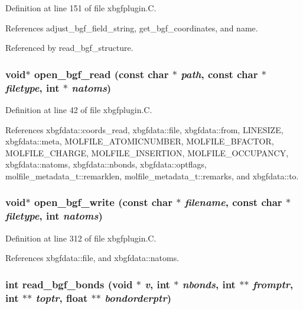 Definition at line 151 of file xbgfplugin.C.

References adjust\_\-bgf\_\-field\_\-string, get\_\-bgf\_\-coordinates, and name.

Referenced by read\_\-bgf\_\-structure.
\subsubsection{\setlength{\rightskip}{0pt plus 5cm}void$\ast$ open\_\-bgf\_\-read (const char $\ast$ {\em path}, const char $\ast$ {\em filetype}, int $\ast$ {\em natoms})\hspace{0.3cm}{\tt  [static]}}\label{xbgfplugin_8C_a2}




Definition at line 42 of file xbgfplugin.C.

References xbgfdata::coords\_\-read, xbgfdata::file, xbgfdata::from, LINESIZE, xbgfdata::meta, MOLFILE\_\-ATOMICNUMBER, MOLFILE\_\-BFACTOR, MOLFILE\_\-CHARGE, MOLFILE\_\-INSERTION, MOLFILE\_\-OCCUPANCY, xbgfdata::natoms, xbgfdata::nbonds, xbgfdata::optflags, molfile\_\-metadata\_\-t::remarklen, molfile\_\-metadata\_\-t::remarks, and xbgfdata::to.
\subsubsection{\setlength{\rightskip}{0pt plus 5cm}void$\ast$ open\_\-bgf\_\-write (const char $\ast$ {\em filename}, const char $\ast$ {\em filetype}, int {\em natoms})\hspace{0.3cm}{\tt  [static]}}\label{xbgfplugin_8C_a8}




Definition at line 312 of file xbgfplugin.C.

References xbgfdata::file, and xbgfdata::natoms.
\subsubsection{\setlength{\rightskip}{0pt plus 5cm}int read\_\-bgf\_\-bonds (void $\ast$ {\em v}, int $\ast$ {\em nbonds}, int $\ast$$\ast$ {\em fromptr}, int $\ast$$\ast$ {\em toptr}, float $\ast$$\ast$ {\em bondorderptr})\hspace{0.3cm}{\tt  [static]}}\label{xbgfplugin_8C_a10}




